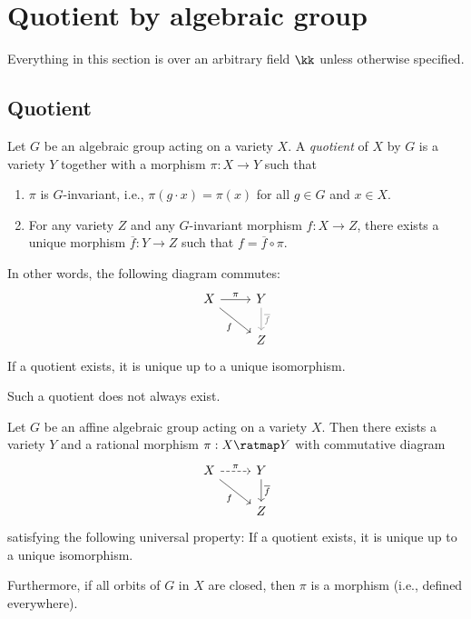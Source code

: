 \section{Quotient by algebraic group}

Everything in this section is over an arbitrary field \(\kk\) unless otherwise specified.

\subsection{Quotient}

    \begin{definition}\label{def:quotient_of_variety_by_group_action}
        Let \(G\) be an algebraic group acting on a variety \(X\).
        A \emph{quotient} of \(X\) by \(G\) is a variety \(Y\) together with a morphism \(\pi: X \to Y\) such that
        \begin{enumerate}
            \item \(\pi\) is \(G\)-invariant, i.e., \(\pi(g \cdot x) = \pi(x)\) for all \(g \in G\) and \(x \in X\).
            \item For any variety \(Z\) and any \(G\)-invariant morphism \(f: X \to Z\), there exists a unique morphism \(\overline{f}: Y \to Z\) such that \(f = \overline{f} \circ \pi\).
        \end{enumerate}
        In other words, the following diagram commutes:
        \[
            \begin{tikzcd}
                X \arrow[r, "\pi"] \arrow[rd, "f"'] & Y \arrow[d, "\overline{f}", gray] \\
                & Z
            \end{tikzcd}
        \]
        If a quotient exists, it is unique up to a unique isomorphism.
    \end{definition}

    Such a quotient does not always exist.

    \begin{theorem}\label{thm:existence_of_quotient_by_algebraic_group}
        Let \(G\) be an affine algebraic group acting on a variety \(X\).
        Then there exists a variety \(Y\) and a rational morphism \(\pi: X \ratmap Y\) with commutative diagram
        \[
            \begin{tikzcd}
                X \arrow[r, dashed, "\pi"] \arrow[rd, "f"'] & Y \arrow[d, "\overline{f}"] \\
                & Z
            \end{tikzcd}
        \]
        satisfying the following universal property:
        If a quotient exists, it is unique up to a unique isomorphism.

        Furthermore, if all orbits of \(G\) in \(X\) are closed, then \(\pi\) is a morphism (i.e., defined everywhere).
    \end{theorem}


